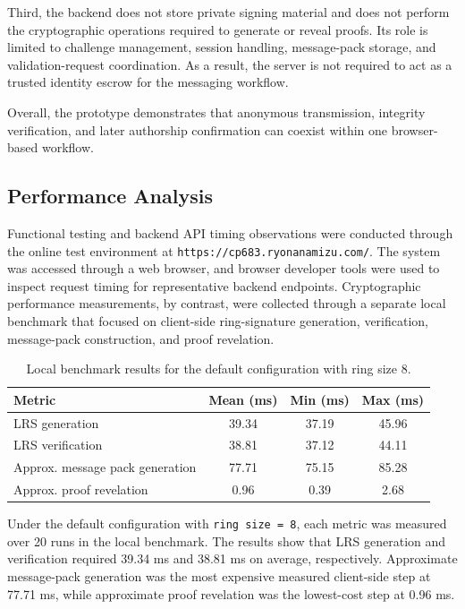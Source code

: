 \documentclass[letterpaper,11pt]{article}
\begin{document}
Third, the backend does not store private signing material and does not perform the cryptographic operations required to generate or reveal proofs. Its role is limited to challenge management, session handling, message-pack storage, and validation-request coordination. As a result, the server is not required to act as a trusted identity escrow for the messaging workflow.

Overall, the prototype demonstrates that anonymous transmission, integrity verification, and later authorship confirmation can coexist within one browser-based workflow.

\subsection{Performance Analysis}
Functional testing and backend API timing observations were conducted through the online test environment at \texttt{https://cp683.ryonanamizu.com/}. The system was accessed through a web browser, and browser developer tools were used to inspect request timing for representative backend endpoints. Cryptographic performance measurements, by contrast, were collected through a separate local benchmark that focused on client-side ring-signature generation, verification, message-pack construction, and proof revelation.

\begin{table}[H]
    \centering
    \begin{tabular}{lccc}
        \toprule
        Metric                          & Mean (ms) & Min (ms) & Max (ms) \\
        \midrule
        LRS generation                  & 39.34     & 37.19    & 45.96    \\
        LRS verification                & 38.81     & 37.12    & 44.11    \\
        Approx. message pack generation & 77.71     & 75.15    & 85.28    \\
        Approx. proof revelation        & 0.96      & 0.39     & 2.68     \\
        \bottomrule
    \end{tabular}
    \caption{Local benchmark results for the default configuration with ring size 8.}
\end{table}

Under the default configuration with \texttt{ring size = 8}, each metric was measured over 20 runs in the local benchmark. The results show that LRS generation and verification required 39.34 ms and 38.81 ms on average, respectively. Approximate message-pack generation was the most expensive measured client-side step at 77.71 ms, while approximate proof revelation was the lowest-cost step at 0.96 ms.
\end{document}

